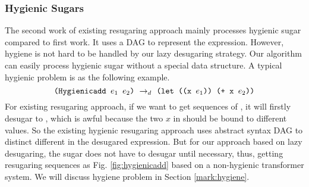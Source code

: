 \subsubsection{Hygienic Sugars}
\label{mark:hygienic}


The second work \cite{hygienic} of existing resugaring approach mainly processes hygienic sugar compared to first work. It uses a DAG to represent the expression. However, hygiene is not hard to be handled by our lazy desugaring strategy. Our algorithm can easily process hygienic sugar without a special data structure.
A typical hygienic problem is as the following example.
\[
\texttt{(Hygienicadd $e_1$ $e_2$)} ~\rightarrow_d~ \texttt{(let ((x $e_1$)) (+ x $e_2$))}
\]
For existing resugaring approach, if we want to get sequences of , it will firstly desugar to , which is awful because the two $x$ in  should be bound to different values. So the existing hygienic resugaring approach uses abstract syntax DAG to distinct different  in the desugared expression. But for our approach based on lazy desugaring, the  sugar does not have to desugar until necessary, thus, getting resugaring sequences as Fig.  \ref{fig:hygienicadd} based on a non-hygienic transformer system. We will discuss hygiene problem in Section \ref{mark:hygiene}.



